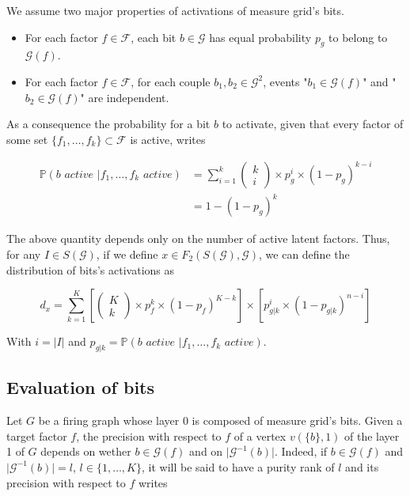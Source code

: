 \documentclass[a4paper, 11pt]{article}
\begin{document}
We assume two major properties of activations of measure grid's bits.

\begin{itemize}
\item For each factor $f \in \mathcal{F}$, each bit $b \in \mathcal{G}$ has equal probability $p_g$ to belong to $\mathcal{G}(f)$.
\item For each factor $f \in \mathcal{F}$, for each couple $b_1, b_2 \in \mathcal{G}^2$, events "$b_1 \in \mathcal{G}(f)$" and "$b_2 \in \mathcal{G}(f)$"  are independent.
\end{itemize}   

As a consequence the probability for a bit $b$ to activate, given that every factor of some set $\{f_1, \ldots, f_k\} \subset \mathcal{F}$ is active, writes

\begin{align*}
\mathbb{P}\left(\textit{b active } \vert f_1, \ldots, f_k \textit{ active}\right) &= \sum_{i=1}^{k} \begin{pmatrix} k \\ i \end{pmatrix} \times p^i_g \times (1 - p_g)^{k - i}\\
 &= 1 - (1 - p_g)^{ k}
\end{align*}

The above quantity depends only on the number of active latent factors. Thus, for any $I \in S(\mathcal{G})$, if we define $x \in F_2 (S(\mathcal{G}) , \mathcal{G})$, we can define the distribution of bits's activations as 

\begin{equation*}
d_x = \sum_{k = 1}^{K} \left[ \begin{pmatrix} K \\ k \end{pmatrix} \times p_f^{k} \times (1-p_f)^{K-k}\right] \times \left[ p^i_{g \vert k} \times (1 - p_{g\vert k})^{n - i} \right]
\end{equation*}

With $i = \vert I \vert$ and $p_{g \vert k} = \mathbb{P}\left(\textit{b active } \vert f_1, \ldots, f_k \textit{ active}\right)$.

\subsection{Evaluation of bits}

Let $G$ be a firing graph whose layer 0 is composed of measure grid's bits. Given a target factor $f$, the precision with respect to $f$ of a vertex $v(\{ b \}, 1)$ of the layer 1 of $G$ depends on wether $b \in \mathcal{G}(f)$ and on $\vert \mathcal{G}^{-1}(b) \vert$. Indeed, if $b \in \mathcal{G}(f)$ and $\vert \mathcal{G}^{-1}(b) \vert = l $, $l \in \{1, \ldots, K\}$, it will be said to have a purity rank of $l$ and its precision with respect to $f$ writes
\end{document}
